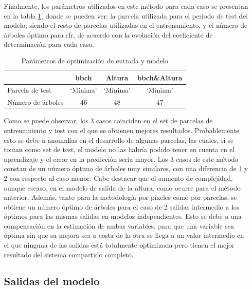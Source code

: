 \par Finalmente, los parámetros utilizados en este método para cada caso se presentan en la tabla \ref{tab:opt_pixl}, donde se pueden ver: la parcela utilizada para el periodo de test del modelo; siendo el resto de parcelas utilizadas en el entrenamiento, y el número de árboles óptimo para \gls{rfr}, de acuerdo con la evolución del coeficiente de determinación para cada caso.

\begin{table}[h]
\centering
\begin{tabular}{l|ccc}
                  & \gls{bbch}     & Altura   & \gls{bbch}\&Altura \\ \hline
Parcela de test   & `Mínima' & `Mínima' & `Mínima'     \\
Número de árboles & 46       & 48       & 47          
\end{tabular}
\caption{Parámetros de optimización de entrada y modelo \label{tab:opt_pixl}}
\end{table}

\par Como se puede observar, los 3 casos coinciden en el set de parcelas de entrenamiento y test con el que se obtienen mejores resultados. Probablemente esto se debe a anomalías en el desarrollo de algunas parcelas, las cuales, si se toman como set de test, el modelo no las habría podido tener en cuenta en el aprendizaje y el error en la predicción sería mayor. Los 3 casos de este método constan de un número óptimo de árboles muy similares, con una diferencia de 1 y 2 con respecto al caso menor. Cabe destacar que el aumento de complejidad, aunque escaso, en el modelo de salida de la altura, como ocurre para el método anterior. Además, tanto para la metodología por píxeles como por parcelas, se obtiene un número óptimo de árboles para el caso de 2 salidas intermedio a los óptimos para las mismas salidas en modelos independientes. Esto se debe a una compensación en la estimación de ambas variables, para que una variable sea óptima sin que su mejora sea a costa de la otra se llega a un valor intermedio en el que ninguna de las salidas está totalmente optimizada pero tienen el mejor resultado del sistema compartido completo. 


\subsection{Salidas del modelo}
